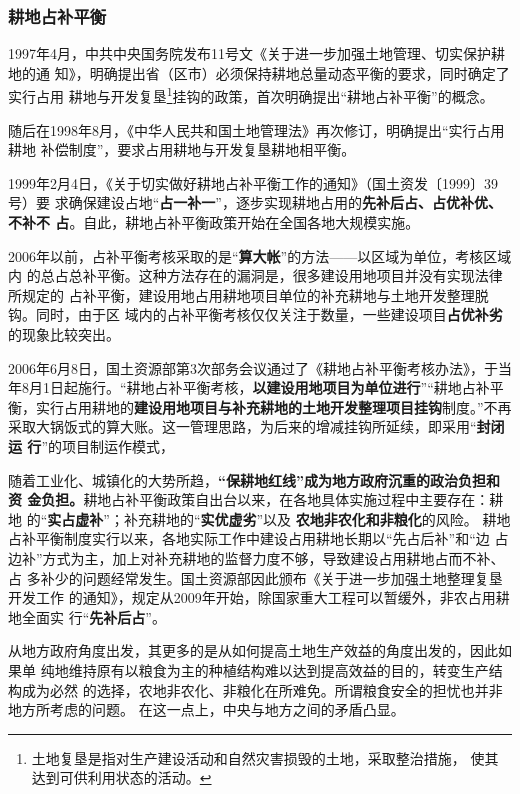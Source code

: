 \subsubsection{耕地占补平衡}

1997年4月，中共中央国务院发布11号文《关于进一步加强土地管理、切实保护耕地的通
知》，明确提出省（区市）必须保持耕地总量动态平衡的要求，同时确定了实行占用
耕地与开发复垦\footnote{土地复垦是指对生产建设活动和自然灾害损毁的土地，采取整治措施，
  使其达到可供利用状态的活动。}挂钩的政策，首次明确提出“耕地占补平衡”的概念。

随后在1998年8月，《中华人民共和国土地管理法》再次修订，明确提出“实行占用耕地
补偿制度”，要求占用耕地与开发复垦耕地相平衡。

1999年2月4日，《关于切实做好耕地占补平衡工作的通知》（国土资发〔1999〕39号）要
求确保建设占地“\textbf{占一补一}”，逐步实现耕地占用的\textbf{先补后占、占优补优、不补不
  占}。自此，耕地占补平衡政策开始在全国各地大规模实施。

2006年以前，占补平衡考核采取的是“\textbf{算大帐}”的方法——以区域为单位，考核区域内
的总占总补平衡。这种方法存在的漏洞是，很多建设用地项目并没有实现法律所规定的
占补平衡，建设用地占用耕地项目单位的补充耕地与土地开发整理脱钩。同时，由于区
域内的占补平衡考核仅仅关注于数量，一些建设项目\textbf{占优补劣}的现象比较突出。

2006年6月8日，国土资源部第3次部务会议通过了《耕地占补平衡考核办法》，于当
年8月1日起施行。“耕地占补平衡考核，\textbf{以建设用地项目为单位进行}”“耕地占补平
衡，实行占用耕地的\textbf{建设用地项目与补充耕地的土地开发整理项目挂钩}制度。”不再
采取大锅饭式的算大账。这一管理思路，为后来的增减挂钩所延续，即采用“\textbf{封闭运
  行}”的项目制运作模式，

随着工业化、城镇化的大势所趋，\textbf{“保耕地红线”成为地方政府沉重的政治负担和资
  金负担。}耕地占补平衡政策自出台以来，在各地具体实施过程中主要存在：耕地
的“\textbf{实占虚补}”；补充耕地的“\textbf{实优虚劣}”以及 \textbf{农地非农化和非粮化}的风险。
耕地占补平衡制度实行以来，各地实际工作中建设占用耕地长期以“先占后补”和“边
占边补”方式为主，加上对补充耕地的监督力度不够，导致建设占用耕地占而不补、占
多补少的问题经常发生。国土资源部因此颁布《关于进一步加强土地整理复垦开发工作
的通知》，规定从2009年开始，除国家重大工程可以暂缓外，非农占用耕地全面实
行“\textbf{先补后占}”。

从地方政府角度出发，其更多的是从如何提高土地生产效益的角度出发的，因此如果单
纯地维持原有以粮食为主的种植结构难以达到提高效益的目的，转变生产结构成为必然
的选择，农地非农化、非粮化在所难免。所谓粮食安全的担忧也并非地方所考虑的问题。
在这一点上，中央与地方之间的矛盾凸显。

